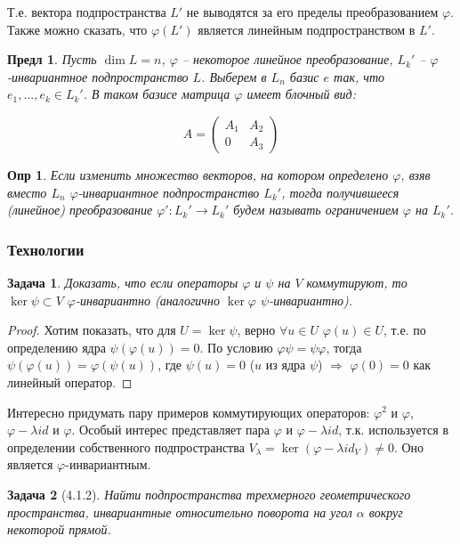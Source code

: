\documentclass[a4paper,12pt]{article}
\newtheorem*{definition}{Опр}
\newtheorem{propos}{Предл}[section]
\newtheorem*{prob}{Задача}
\begin{document}
Т.е. вектора подпространства $L'$ не выводятся за его пределы преобразованием $\varphi$. Также можно сказать, что $\varphi(L')$ является линейным подпространством в $L'$.

\begin{propos}
	Пусть $\dim L = n$, $\varphi$ -- некоторое линейное преобразование, $L_k'$ -- $\varphi$-инвариантное подпространство $L$. Выберем в $L_n$ базис $e$ так, что $e_1, \ldots, e_k \in L_k'$. В таком базисе матрица $\varphi$ имеет блочный вид:
	
	\[
		A = \begin{pmatrix}
			A_1 & A_2 \\
			0 & A_3 
		\end{pmatrix}
	\]
\end{propos}

\begin{definition}
	Если изменить множество векторов, на котором определено $\varphi$, взяв вместо $L_n$ $\varphi$-инвариантное подпространство $L_k'$, тогда получившееся (линейное) преобразование $\varphi': L_k' \to L_k'$ будем называть ограничением $\varphi$ на $L_k'$.
\end{definition}

\subsubsection{Технологии}

\begin{prob}
	Доказать, что если операторы $\varphi$ и $\psi$ на $V$ коммутируют, то $\ker \psi \subset V$ $\varphi$-инвариантно (аналогично $\ker \varphi$ $\psi$-инвариантно).
\end{prob}
\begin{proof}
	Хотим показать, что для $U = \ker \psi$, верно $\forall u \in U$ $\varphi(u) \in U$, т.е. по определению ядра $\psi(\varphi(u)) = 0$. По условию $\varphi \psi = \psi \varphi$, тогда $\psi(\varphi(u)) = \varphi(\psi(u))$, где $\psi(u) = 0$ ($u$ из ядра $\psi$) $\Rightarrow$ $\varphi(0) = 0$ как линейный оператор.
\end{proof}

Интересно придумать пару примеров коммутирующих операторов: $\varphi^2$ и $\varphi$, $\varphi - \lambda id$ и $\varphi$. Особый интерес представляет пара $\varphi$ и $\varphi - \lambda id$, т.к. используется в определении собственного подпространства $V_\lambda = \ker(\varphi - \lambda id_V) \ne 0$. Оно является $\varphi$-инвариантным.

\begin{prob}[4.1.2]
	Найти подпространства трехмерного геометрического пространства, инвариантные относительно поворота на угол $\alpha$ вокруг некоторой прямой.
\end{prob}
\end{document}
